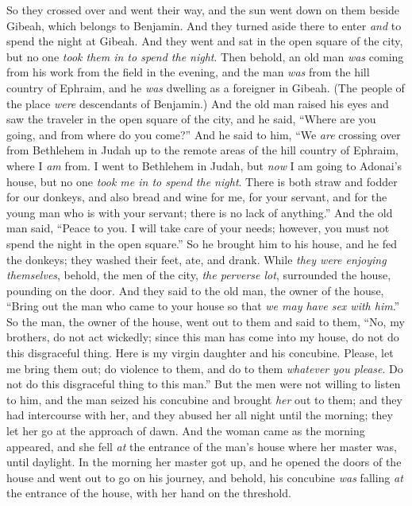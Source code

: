 \begin{biblechapter}
\verse So they crossed over and went their way, and the sun went down on them beside Gibeah, which belongs to Benjamin.
\verse And they turned aside there to enter \textit{and} to spend the night at Gibeah. And they went and sat in the open square of the city, but no one \textit{took them in to spend the night}.
\verse Then behold, an old man \textit{was} coming from his work from the field in the evening, and the man \textit{was} from the hill country of Ephraim, and he \textit{was} dwelling as a foreigner in Gibeah. (The people of the place \textit{were} descendants of Benjamin.)
\verse And the old man raised his eyes and saw the traveler in the open square of the city, and he said, “Where are you going, and from where do you come?”
\verse And he said to him, “We \textit{are} crossing over from Bethlehem in Judah up to the remote areas of the hill country of Ephraim, where I \textit{am} from. I went to Bethlehem in Judah, but \textit{now} I am going to Adonai’s house, but no one \textit{took me in to spend the night}.
\verse There is both straw and fodder for our donkeys, and also bread and wine for me, for your servant, and for the young man who is with your servant; there is no lack of anything.”
\verse And the old man said, “Peace to you. I will take care of your needs; however, you must not spend the night in the open square.”
\verse So he brought him to his house, and he fed the donkeys; they washed their feet, ate, and drank.
\verse While \textit{they were enjoying themselves}, behold, the men of the city, \textit{the perverse lot}, surrounded the house, pounding on the door. And they said to the old man, the owner of the house, “Bring out the man who came to your house so that \textit{we may have sex with him}.”
\verse So the man, the owner of the house, went out to them and said to them, “No, my brothers, do not act wickedly; since this man has come into my house, do not do this disgraceful thing.
\verse Here is my virgin daughter and his concubine. Please, let me bring them out; do violence to them, and do to them \textit{whatever you please}. Do not do this disgraceful thing to this man.”
\verse But the men were not willing to listen to him, and the man seized his concubine and brought \textit{her} out to them; and they had intercourse with her, and they abused her all night until the morning; they let her go at the approach of dawn.
\verse And the woman came as the morning appeared, and she fell \textit{at} the entrance of the man’s house where her master was, until daylight.
\verse In the morning her master got up, and he opened the doors of the house and went out to go on his journey, and behold, his concubine \textit{was} falling \textit{at} the entrance of the house, with her hand on the threshold.

\end{biblechapter}
